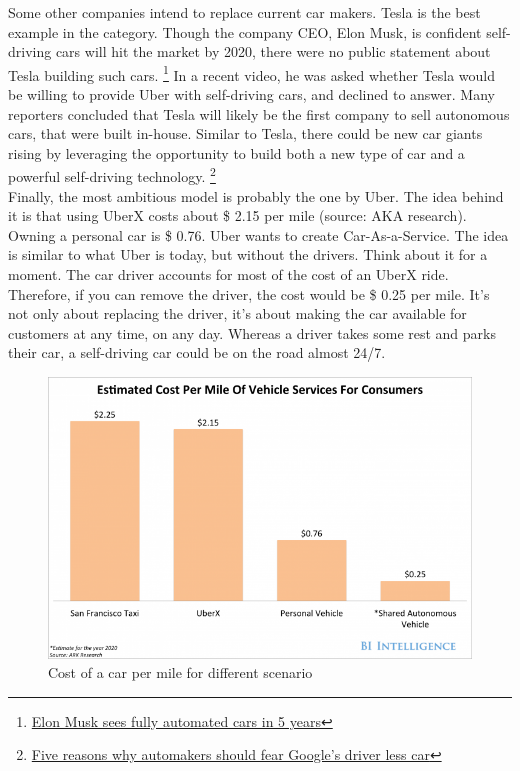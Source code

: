 \documentclass[12pt]{article}
\begin{document}
Some other companies intend to replace current car makers. Tesla is the best
example in the category. Though the company CEO, Elon Musk, is confident
self-driving cars will hit the market by 2020, there were no public statement
about Tesla building such cars. \footnote{\href{http://my.teslamotors.com/fr_CH/forum/forums/tesla\%E2\%80\%99s-musk-sees-fully-autonomous-car-ready-5-years}
{Elon Musk sees fully automated cars in 5 years}} In a recent video, he was asked whether Tesla
would be willing to provide Uber with self-driving cars, and declined to answer.
Many reporters concluded that Tesla will likely be the first company to sell
autonomous cars, that were built in-house. Similar to Tesla, there could be new
car giants rising by leveraging the opportunity to build both a new type of car
and a powerful self-driving technology. \footnote{\href{http://www.forbes.com/sites/chunkamui/2014/08/04/5-reasons-why-automakers-should-fear-googles-driverless-car/}
{Five reasons why automakers should fear Google's driver less car}}\\

Finally, the most ambitious model is probably the one by Uber. The idea behind
it is that using UberX costs about \$ 2.15 per mile (source: AKA research).
Owning a personal car is \$ 0.76. Uber wants to create Car-As-a-Service.
The idea is similar to what Uber is today, but without the drivers. Think about
it for a moment. The car driver accounts for most of the cost of an UberX ride.
Therefore, if you can remove the driver, the cost would be \$ 0.25 per mile.
It's not only about replacing the driver, it's about making the car available
for customers at any time, on any day. Whereas a driver takes some rest and
parks their car, a self-driving car could be on the road almost 24/7.

\medskip

\begin{figure}[ht]
    \centering
    \includegraphics[width=\linewidth]{vehicle-cost}
    \caption{Cost of a car per mile for different scenario}
    \label{fig:cost_of_car}
\end{figure}
\end{document}
